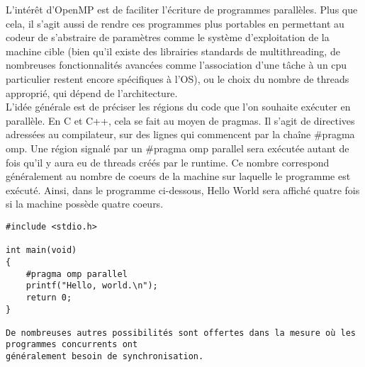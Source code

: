 \documentclass{report}
\begin{document}
L'intérêt d'OpenMP est de faciliter l'écriture de programmes parallèles. Plus que cela, il s'agit aussi 
de rendre ces programmes plus portables en permettant au codeur de s'abstraire de paramètres comme le 
système d'exploitation de la machine cible (bien qu'il existe des librairies standards de multithreading, 
de nombreuses fonctionnalités avancées comme l'association d'une tâche à un cpu particulier restent encore
spécifiques à l'OS), ou le choix du nombre de threads approprié, qui dépend de l'architecture.
\\L'idée générale est de préciser les régions du code que l'on souhaite exécuter en parallèle. En C et 
C++, cela se fait au moyen de pragmas. Il s'agit de directives adressées au compilateur, sur des lignes qui 
commencent par la chaîne \#pragma omp. Une région signalé par un \#pragma omp parallel sera 
exécutée autant de fois qu'il y aura eu de threads créés par le runtime. Ce nombre correspond généralement 
au nombre de coeurs de la machine sur laquelle le programme est exécuté. Ainsi, dans le programme 
ci-dessous, Hello World sera affiché quatre fois si la machine possède quatre coeurs.
\begin{lstlisting}
#include <stdio.h>

int main(void)
{
    #pragma omp parallel
    printf("Hello, world.\n");
    return 0;
}

De nombreuses autres possibilités sont offertes dans la mesure où les programmes concurrents ont
généralement besoin de synchronisation.

\end{lstlisting}
\end{document}
